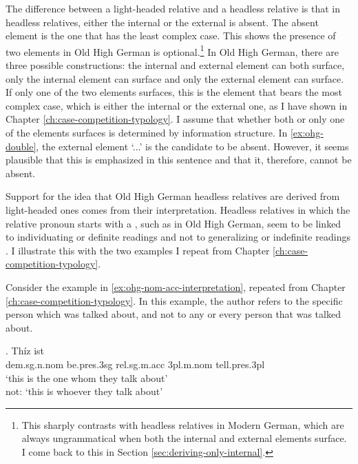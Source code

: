 The difference between a light-headed relative and a headless relative is that in headless relatives, either the internal or the external is absent. The absent element is the one that has the least complex case. This shows the presence of two elements in Old High German is optional.\footnote{
This sharply contrasts with headless relatives in Modern German, which are always ungrammatical when both the internal and external elements surface. I come back to this in Section \ref{sec:deriving-only-internal}.
}
In Old High German, there are three possible constructions: the internal and external element can both surface, only the internal element can surface and only the external element can surface. If only one of the two elements surfaces, this is the element that bears the most complex case, which is either the internal or the external one, as I have shown in Chapter \ref{ch:case-competition-typology}. I assume that whether both or only one of the elements surfaces is determined by information structure. In \ref{ex:ohg-double}, the external element  `...' is the candidate to be absent. However, it seems plausible that this is emphasized in this sentence and that it, therefore, cannot be absent.

Support for the idea that Old High German headless relatives are derived from light-headed ones comes from their interpretation. Headless relatives in which the relative pronoun starts with a , such as in Old High German, seem to be linked to individuating or definite readings and not to generalizing or indefinite readings \citep[cf.][]{fuss2017}. I illustrate this with the two examples I repeat from Chapter  \ref{ch:case-competition-typology}.

Consider the example in \ref{ex:ohg-nom-acc-interpretation}, repeated from Chapter \ref{ch:case-competition-typology}.
In this example, the author refers to the specific person which was talked about, and not to any or every person that was talked about.

\exg. Thíz ist   \\
\ac{dem}.\ac{sg}.\ac{n}.\ac{nom} be.\ac{pres}.3\ac{sg}\scsub{[nom]} \ac{rel}.\ac{sg}.\ac{m}.\ac{acc}
3\ac{pl}.\ac{m}.\ac{nom} tell.\ac{pres}.3\ac{pl}\scsub{[acc]}\\
`this is the one whom they talk about'\\
not: `this is whoever they talk about' \label{ex:ohg-nom-acc-interpretation}

